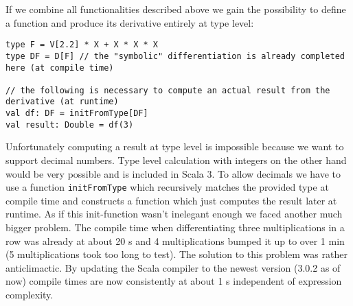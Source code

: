 If we combine all functionalities described above we gain the possibility to define a function and produce its derivative entirely at type level:
\begin{lstlisting}
type F = V[2.2] * X + X * X * X
type DF = D[F] // the "symbolic" differentiation is already completed here (at compile time)

// the following is necessary to compute an actual result from the derivative (at runtime)
val df: DF = initFromType[DF] 
val result: Double = df(3)
\end{lstlisting}
Unfortunately computing a result at type level is impossible because we want to support decimal numbers. Type level calculation with integers on the other hand would be very possible and is included in Scala 3. To allow decimals we have to use a function \lstinline{initFromType} which recursively matches the provided type at compile time and constructs a function which just computes the result later at runtime. As if this init-function wasn't inelegant enough we faced another much bigger problem. The compile time when differentiating three multiplications in a row was already at about 20 s and 4 multiplications bumped it up to over 1 min (5 multiplications took too long to test). The solution to this problem was rather anticlimactic. By updating the Scala compiler to the newest version (3.0.2 as of now) compile times are now consistently at about 1 s independent of expression complexity.
